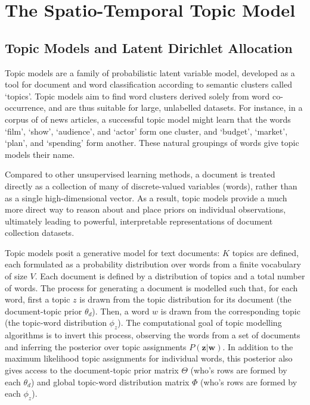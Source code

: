 
\chapter{The Spatio-Temporal Topic Model} \label{ch:topic-models-detail}

\section{Topic Models and Latent Dirichlet Allocation}


Topic models are a family of probabilistic latent variable model, developed as a tool for document and word classification according to semantic clusters called `topics'. Topic models aim to find word clusters derived solely from word co-occurrence, and are thus suitable for large, unlabelled datasets. For instance, in a corpus of of news articles, a successful topic model might learn that the words `film', `show', `audience', and `actor' form one cluster, and `budget', `market', `plan', and `spending' form another. These natural groupings of words give topic models their name.

Compared to other unsupervised learning methods, a document is treated directly as a collection of many of discrete-valued variables (words), rather than as a single high-dimensional vector. As a result, topic models provide a much more direct way to reason about and place priors on individual observations, ultimately leading to powerful, interpretable representations of document collection datasets.

Topic models posit a generative model for text documents: $K$ topics are defined, each formulated as a probability distribution over words from a finite vocabulary of size $V$. Each document is defined by a distribution of topics and a total number of words. The process for generating a document is modelled such that, for each word, first a topic $z$ is drawn from the topic distribution for its document (the document-topic prior $\theta_d$). Then, a word $w$ is drawn from the corresponding topic (the topic-word distribution $\phi_z$). The computational goal of topic modelling algorithms is to invert this process, observing the words from a set of documents and inferring the posterior over topic assignments $P(\boldsymbol{z} | \boldsymbol{w})$. In addition to the maximum likelihood topic assignments for individual words, this posterior also gives access to the document-topic prior matrix $\Theta$ (who's rows are formed by each $\theta_d$) and global topic-word distribution matrix $\Phi$ (who's rows are formed by each $\phi_z$).

